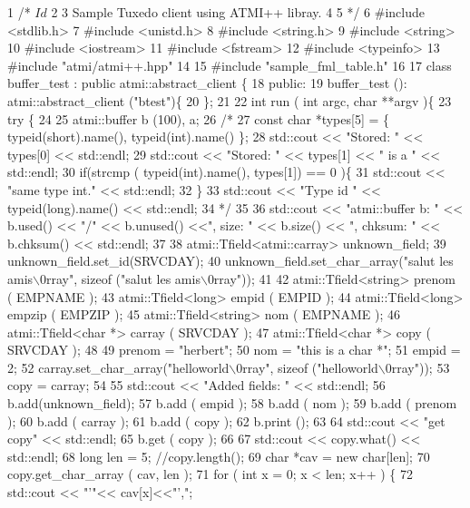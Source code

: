 \begin{DoxyCodeInclude}
1 /* $Id$
2 
3    Sample Tuxedo client using ATMI++ libray.
4 
5  */
6 #include <stdlib.h>
7 #include <unistd.h>
8 #include <string.h>
9 #include <string>
10 #include <iostream>
11 #include <fstream>
12 #include <typeinfo>
13 #include "atmi/atmi++.hpp"
14 
15 #include "sample\_fml\_table.h"
16 
17 class buffer\_test : public atmi::abstract\_client \{
18   public:
19     buffer\_test (): atmi::abstract\_client ("btest")\{
20     \};
21 
22     int run ( int argc, char **argv )\{
23       try \{
24 
25         atmi::buffer b (100), a;
26         /*
27            const char *types[5] = \{ typeid(short).name(), typeid(int).name() \};
28            std::cout << "Stored: " << types[0] << std::endl;
29            std::cout << "Stored: " << types[1] << " is a " << std::endl;
30            if(strcmp ( typeid(int).name(), types[1]) == 0 )\{
31            std::cout << "same type int." << std::endl;
32            \}
33            std::cout << "Type id " << typeid(long).name() << std::endl;
34          */
35 
36         std::cout << "atmi::buffer b: " << b.used() << "/" << b.unused() <<", size: " << b.size() << ",
       chksum: " << b.chksum() <<  std::endl;
37 
38         atmi::Tfield<atmi::carray>   unknown\_field;
39         unknown\_field.set\_id(SRVCDAY);
40         unknown\_field.set\_char\_array("salut les amis\(\backslash\)0rray", sizeof ("salut les amis\(\backslash\)0rray"));
41 
42         atmi::Tfield<string> prenom ( EMPNAME );
43         atmi::Tfield<long>   empid ( EMPID );
44         atmi::Tfield<long>   empzip ( EMPZIP );
45         atmi::Tfield<string> nom ( EMPNAME );
46         atmi::Tfield<char *> carray ( SRVCDAY );
47         atmi::Tfield<char *> copy ( SRVCDAY );
48 
49         prenom = "herbert";
50         nom = "this is a char *";
51         empid = 2;
52         carray.set\_char\_array("helloworld\(\backslash\)0rray", sizeof ("helloworld\(\backslash\)0rray"));
53         copy = carray;
54 
55         std::cout << "Added fields: " << std::endl;
56         b.add(unknown\_field);
57         b.add ( empid );
58         b.add ( nom );
59         b.add ( prenom );
60         b.add ( carray );
61         b.add ( copy );
62         b.print ();
63 
64         std::cout << "get copy" << std::endl;
65         b.get ( copy );
66 
67         std::cout << copy.what() << std::endl;
68         long len = 5;                  //copy.length();
69         char *cav = new char[len];
70         copy.get\_char\_array ( cav, len );
71         for ( int x = 0; x < len; x++ ) \{
72           std::cout << "'"<< cav[x]<<"',";

\end{DoxyCodeInclude}
